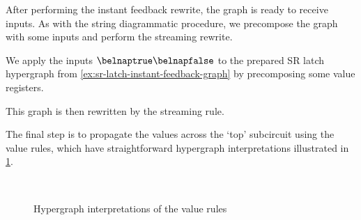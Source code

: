 After performing the instant feedback rewrite, the graph is ready to receive
inputs.
As with the string diagrammatic procedure, we precompose the graph with some
inputs and perform the streaming rewrite.

\begin{example}\label{ex:sr-latch-streaming-graph}
    We apply the inputs \(\belnaptrue\belnapfalse\) to the prepared SR latch
    hypergraph from \cref{ex:sr-latch-instant-feedback-graph} by precomposing
    some value registers.
    \vspace{-1em}
    \begin{center}
    \end{center}
    This graph is then rewritten by the streaming rule.
    \vspace{-1em}
    \begin{center}
    \end{center}
\end{example}

The final step is to propagate the values across the `top' subcircuit using the
value rules, which have straightforward hypergraph interpretations illustrated
in \cref{fig:graph-values}.

\begin{figure}
    \centering
    \scalebox{0.8}{}
    \quad
    \raisebox{0.5em}{\scalebox{0.8}{}}
    \\
    \scalebox{0.8}{}
    \quad
    \raisebox{1em}{\scalebox{0.8}{}}
    \caption{Hypergraph interpretations of the value rules}
    \label{fig:graph-values}
\end{figure}

